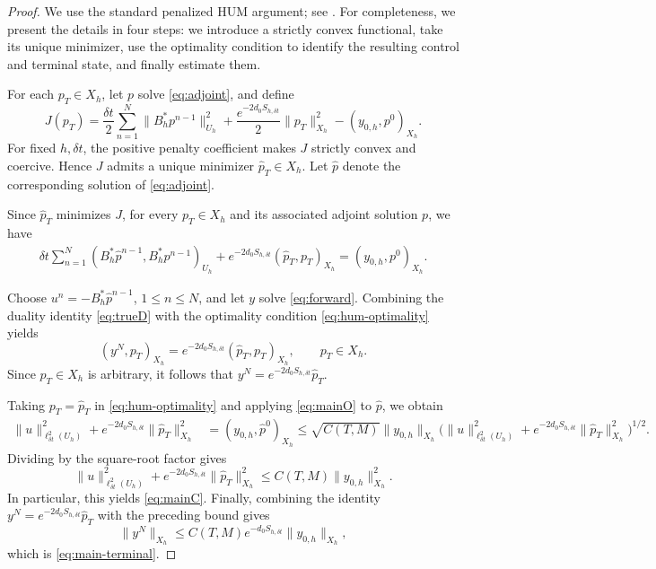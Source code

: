 \documentclass[print,wide,eng]{draft}
\begin{document}
%
\begin{proof}
We use the standard penalized HUM argument; see \cite[Propositions~2.2 and~2.4]{Boyer2013}. For completeness, we present the details in four steps: we introduce a strictly convex functional, take its unique minimizer, use the optimality condition to identify the resulting control and terminal state, and finally estimate them.

\medskip


For each $p_T\in X_h$, let $p$ solve \cref{eq:adjoint}, and define
$$
J(p_T)=\frac{\delta t}{2}\sum_{n=1}^N\|B_h^*p^{n-1}\|_{U_h}^2
+\frac{e^{-2d_0S_{h,\delta t}}}{2}\|p_T\|_{X_h}^2
-(y_{0,h},p^0)_{X_h}.
$$
For fixed $h,\delta t$, the positive penalty coefficient makes $J$ strictly convex and coercive. Hence $J$ admits a unique minimizer $\widehat p_T\in X_h$. Let $\widehat p$ denote the corresponding  solution of  \cref{eq:adjoint}.

\smallskip

Since $\widehat p_T$ minimizes $J$, for every $p_T\in X_h$ and its associated adjoint solution $p$, we have
\begin{align}\label{eq:hum-optimality}
\delta t\sum_{n=1}^N(B_h^*\widehat p^{n-1},B_h^*p^{n-1})_{U_h}
+e^{-2d_0S_{h,\delta t}}(\widehat p_T,p_T)_{X_h}
=(y_{0,h},p^0)_{X_h}.
\end{align}


Choose
$
u^n=-B_h^*\widehat p^{n-1}$, $1\le n\le N$,
and let $y$ solve \cref{eq:forward}. Combining the duality identity \cref{eq:trueD} with the optimality condition \cref{eq:hum-optimality} yields
$$
(y^N,p_T)_{X_h}=e^{-2d_0S_{h,\delta t}}(\widehat p_T,p_T)_{X_h},
\qquad p_T\in X_h.
$$
Since $p_T\in X_h$ is arbitrary, it follows that
$
y^N=e^{-2d_0S_{h,\delta t}}\widehat p_T$.


Taking $p_T=\widehat p_T$ in \cref{eq:hum-optimality} and applying \cref{eq:mainO} to $\widehat p$, we obtain
\begin{align*}
\|u\|_{\ell_{\delta t}^2(U_h)}^2+e^{-2d_0S_{h,\delta t}}\|\widehat p_T\|_{X_h}^2
&=(y_{0,h},\widehat p^0)_{X_h} \le\sqrt{C(T,M)}\|y_{0,h}\|_{X_h}
\bigl(\|u\|_{\ell_{\delta t}^2(U_h)}^2
+e^{-2d_0S_{h,\delta t}}\|\widehat p_T\|_{X_h}^2\bigr)^{1/2}.
\end{align*}
Dividing by the square-root factor gives
$$
\|u\|_{\ell_{\delta t}^2(U_h)}^2+e^{-2d_0S_{h,\delta t}}\|\widehat p_T\|_{X_h}^2
\le C(T,M)\|y_{0,h}\|_{X_h}^2.
$$
In particular, this yields \cref{eq:mainC}. Finally, combining the identity $y^N=e^{-2d_0S_{h,\delta t}}\widehat p_T$ with the preceding bound gives
$$
\|y^N\|_{X_h}\le C(T,M)e^{-d_0S_{h,\delta t}}\|y_{0,h}\|_{X_h},
$$
which is \cref{eq:main-terminal}.
\end{proof}
\end{document}

